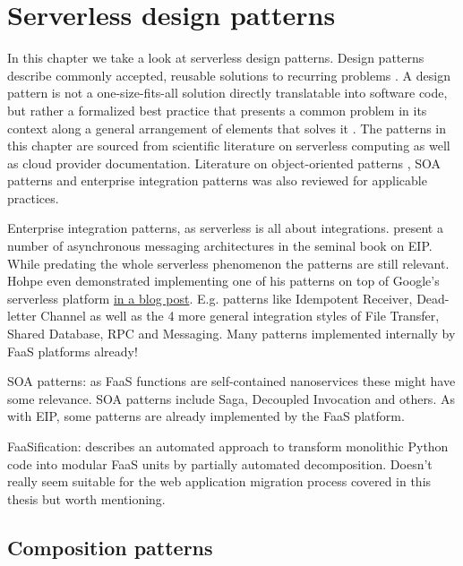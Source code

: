 \chapter{Serverless design patterns} \label{cha:patterns}

In this chapter we take a look at serverless design patterns. Design patterns describe commonly accepted, reusable solutions to recurring problems \parencite{hohpe2004enterprise}. A design pattern is not a one-size-fits-all solution directly translatable into software code, but rather a formalized best practice that presents a common problem in its context along a general arrangement of elements that solves it \parencite{gamma94designPatterns}. The patterns in this chapter are sourced from scientific literature on serverless computing as well as cloud provider documentation. Literature on object-oriented patterns \parencite{gamma94designPatterns}, SOA patterns \parencite{rotem12soa} and enterprise integration patterns \parencite{hohpe2004enterprise} was also reviewed for applicable practices.

Enterprise integration patterns, as serverless is all about integrations. \textcite{hohpe2004enterprise} present a number of asynchronous messaging architectures in the seminal book on EIP. While predating the whole serverless phenomenon the patterns are still relevant. Hohpe even demonstrated implementing one of his patterns on top of Google's serverless platform \href{http://www.enterpriseintegrationpatterns.com/ramblings/google_cloud_functions.html}{in a blog post}. E.g. patterns like Idempotent Receiver, Dead-letter Channel as well as the 4 more general integration styles of File Transfer, Shared Database, RPC and Messaging. Many patterns implemented internally by FaaS platforms already!

SOA patterns: as FaaS functions are self-contained nanoservices these might have some relevance. SOA patterns \parencite{rotem12soa} include Saga, Decoupled Invocation and others. As with EIP, some patterns are already implemented by the FaaS platform.

FaaSification: \textcite{spillner17transformpython} describes an automated approach to transform monolithic Python code into modular FaaS units by partially automated decomposition. Doesn't really seem suitable for the web application migration process covered in this thesis but worth mentioning.

\section{Composition patterns} \label{sec:compositionPatterns}


